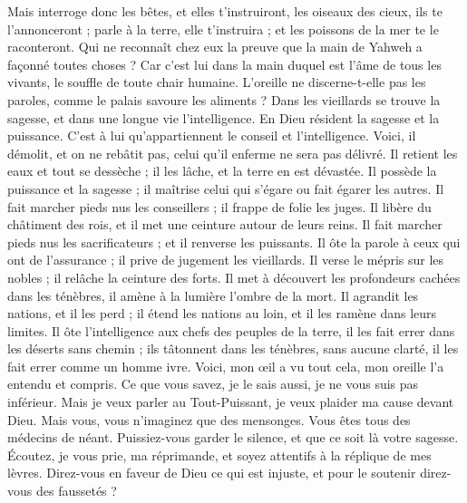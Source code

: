 \begin{multicols}{2}
Mais interroge donc les bêtes, et elles t'instruiront, les oiseaux des cieux, ils te l'annonceront ;
parle à la terre, elle t'instruira ; et les poissons de la mer te le raconteront.
Qui ne reconnaît chez eux la preuve que la main de Yahweh a façonné toutes choses ?
Car c'est lui dans la main duquel est l'âme de tous les vivants, le souffle de toute chair humaine.
L'oreille ne discerne-t-elle pas les paroles, comme le palais savoure les aliments ?
Dans les vieillards se trouve la sagesse, et dans une longue vie l'intelligence.
En Dieu résident la sagesse et la puissance. C'est à lui qu'appartiennent le conseil et l'intelligence.
Voici, il démolit, et on ne rebâtit pas, celui qu'il enferme ne sera pas délivré.
Il retient les eaux et tout se dessèche ; il les lâche, et la terre en est dévastée.
Il possède la puissance et la sagesse ; il maîtrise celui qui s'égare ou fait égarer les autres.
Il fait marcher pieds nus les conseillers ; il frappe de folie les juges.
Il libère du châtiment des rois, et il met une ceinture autour de leurs reins.
Il fait marcher pieds nus les sacrificateurs ; et il renverse les puissants.
Il ôte la parole à ceux qui ont de l'assurance ; il prive de jugement les vieillards.
Il verse le mépris sur les nobles ; il relâche la ceinture des forts.
Il met à découvert les profondeurs cachées dans les ténèbres, il amène à la lumière l'ombre de la mort.
Il agrandit les nations, et il les perd ; il étend les nations au loin, et il les ramène dans leurs limites.
Il ôte l'intelligence aux chefs des peuples de la terre, il les fait errer dans les déserts sans chemin ;
ils tâtonnent dans les ténèbres, sans aucune clarté, il les fait errer comme un homme ivre.
\VerseOne{}Voici, mon œil a vu tout cela, mon oreille l'a entendu et compris.
Ce que vous savez, je le sais aussi, je ne vous suis pas inférieur.
Mais je veux parler au Tout-Puissant, je veux plaider ma cause devant Dieu.
Mais vous, vous n'imaginez que des mensonges. Vous êtes tous des médecins de néant.
Puissiez-vous garder le silence, et que ce soit là votre sagesse.
Écoutez, je vous prie, ma réprimande, et soyez attentifs à la réplique de mes lèvres.
Direz-vous en faveur de Dieu ce qui est injuste, et pour le soutenir direz-vous des faussetés ?

\end{multicols}
